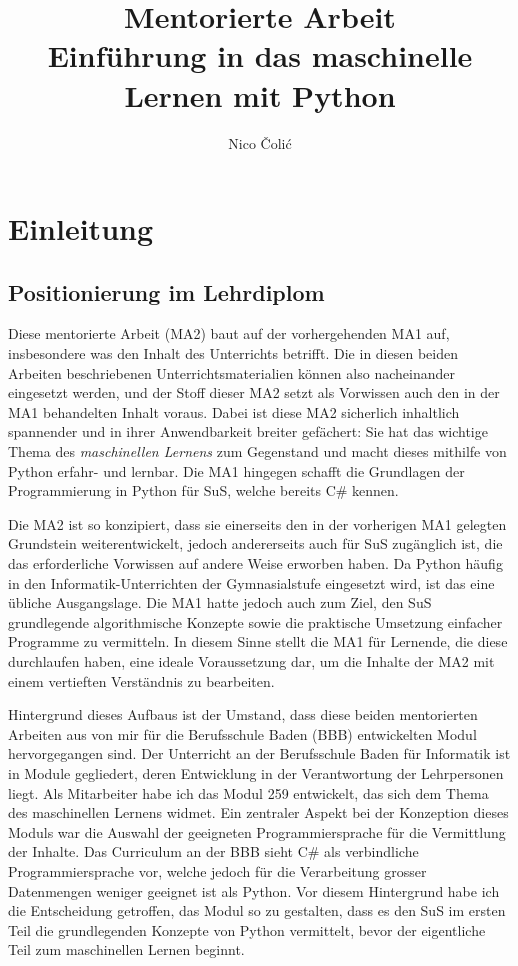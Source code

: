 \documentclass[twocolumn]{article}
\title{\textbf{Mentorierte Arbeit}\\
\vspace{0.5cm}
Einführung in das maschinelle Lernen mit Python}
\author{Nico Čolić}
\begin{document}
\maketitle

\section{Einleitung}

\subsection{Positionierung im Lehrdiplom}
Diese mentorierte Arbeit (MA2) baut auf der vorhergehenden MA1 auf, insbesondere was den Inhalt des Unterrichts betrifft. Die in diesen beiden Arbeiten beschriebenen Unterrichtsmaterialien können also nacheinander eingesetzt werden, und der Stoff dieser MA2 setzt als Vorwissen auch den in der MA1 behandelten Inhalt voraus. Dabei ist diese MA2 sicherlich inhaltlich spannender und in ihrer Anwendbarkeit breiter gefächert: Sie hat das wichtige Thema des \textit{maschinellen Lernens} zum Gegenstand und macht dieses mithilfe von Python erfahr- und lernbar. Die MA1 hingegen schafft die Grundlagen der Programmierung in Python für SuS, welche bereits C\# kennen. 

Die MA2 ist so konzipiert, dass sie einerseits den in der vorherigen MA1 gelegten Grundstein weiterentwickelt, jedoch andererseits auch für SuS zugänglich ist, die das erforderliche Vorwissen auf andere Weise erworben haben. Da Python häufig  in den Informatik-Unterrichten der Gymnasialstufe eingesetzt wird, ist das eine übliche Ausgangslage. Die MA1 hatte jedoch auch zum Ziel, den SuS grundlegende algorithmische Konzepte sowie die praktische Umsetzung einfacher Programme zu vermitteln. In diesem Sinne stellt die MA1 für Lernende, die diese durchlaufen haben, eine ideale Voraussetzung dar, um die Inhalte der MA2 mit einem vertieften Verständnis zu bearbeiten.

Hintergrund dieses Aufbaus ist der Umstand, dass diese beiden mentorierten Arbeiten aus von mir für die Berufsschule Baden (BBB) entwickelten Modul hervorgegangen sind. Der Unterricht an der Berufsschule Baden für Informatik ist in Module gegliedert, deren Entwicklung in der Verantwortung der Lehrpersonen liegt. Als Mitarbeiter habe ich das Modul 259 entwickelt, das sich dem Thema des maschinellen Lernens widmet. Ein zentraler Aspekt bei der Konzeption dieses Moduls war die Auswahl der geeigneten Programmiersprache für die Vermittlung der Inhalte. Das Curriculum an der BBB sieht C\# als verbindliche Programmiersprache vor, welche jedoch für die Verarbeitung grosser Datenmengen weniger geeignet ist als Python. Vor diesem Hintergrund habe ich die Entscheidung getroffen, das Modul so zu gestalten, dass es den SuS im ersten Teil die grundlegenden Konzepte von Python vermittelt, bevor der eigentliche Teil zum maschinellen Lernen beginnt.
\end{document}
